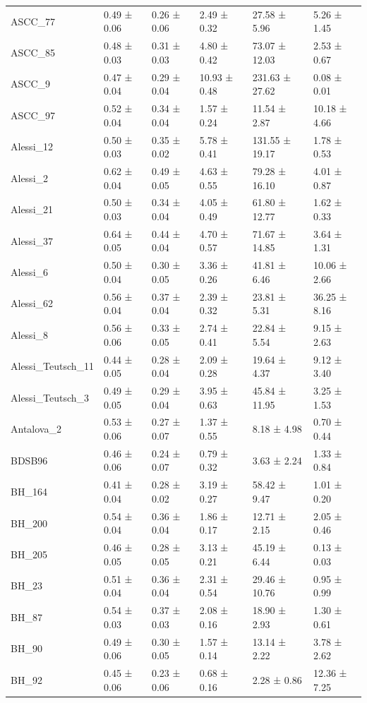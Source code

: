\begin{tabular}{llllll}
ASCC_77 & 0.49 ± 0.06 & 0.26 ± 0.06 & 2.49 ± 0.32 & 27.58 ± 5.96 & 5.26 ± 1.45 \\
ASCC_85 & 0.48 ± 0.03 & 0.31 ± 0.03 & 4.80 ± 0.42 & 73.07 ± 12.03 & 2.53 ± 0.67 \\
ASCC_9 & 0.47 ± 0.04 & 0.29 ± 0.04 & 10.93 ± 0.48 & 231.63 ± 27.62 & 0.08 ± 0.01 \\
ASCC_97 & 0.52 ± 0.04 & 0.34 ± 0.04 & 1.57 ± 0.24 & 11.54 ± 2.87 & 10.18 ± 4.66 \\
Alessi_12 & 0.50 ± 0.03 & 0.35 ± 0.02 & 5.78 ± 0.41 & 131.55 ± 19.17 & 1.78 ± 0.53 \\
Alessi_2 & 0.62 ± 0.04 & 0.49 ± 0.05 & 4.63 ± 0.55 & 79.28 ± 16.10 & 4.01 ± 0.87 \\
Alessi_21 & 0.50 ± 0.03 & 0.34 ± 0.04 & 4.05 ± 0.49 & 61.80 ± 12.77 & 1.62 ± 0.33 \\
Alessi_37 & 0.64 ± 0.05 & 0.44 ± 0.04 & 4.70 ± 0.57 & 71.67 ± 14.85 & 3.64 ± 1.31 \\
Alessi_6 & 0.50 ± 0.04 & 0.30 ± 0.05 & 3.36 ± 0.26 & 41.81 ± 6.46 & 10.06 ± 2.66 \\
Alessi_62 & 0.56 ± 0.04 & 0.37 ± 0.04 & 2.39 ± 0.32 & 23.81 ± 5.31 & 36.25 ± 8.16 \\
Alessi_8 & 0.56 ± 0.06 & 0.33 ± 0.05 & 2.74 ± 0.41 & 22.84 ± 5.54 & 9.15 ± 2.63 \\
Alessi_Teutsch_11 & 0.44 ± 0.05 & 0.28 ± 0.04 & 2.09 ± 0.28 & 19.64 ± 4.37 & 9.12 ± 3.40 \\
Alessi_Teutsch_3 & 0.49 ± 0.05 & 0.29 ± 0.04 & 3.95 ± 0.63 & 45.84 ± 11.95 & 3.25 ± 1.53 \\
Antalova_2 & 0.53 ± 0.06 & 0.27 ± 0.07 & 1.37 ± 0.55 & 8.18 ± 4.98 & 0.70 ± 0.44 \\
BDSB96 & 0.46 ± 0.06 & 0.24 ± 0.07 & 0.79 ± 0.32 & 3.63 ± 2.24 & 1.33 ± 0.84 \\
BH_164 & 0.41 ± 0.04 & 0.28 ± 0.02 & 3.19 ± 0.27 & 58.42 ± 9.47 & 1.01 ± 0.20 \\
BH_200 & 0.54 ± 0.04 & 0.36 ± 0.04 & 1.86 ± 0.17 & 12.71 ± 2.15 & 2.05 ± 0.46 \\
BH_205 & 0.46 ± 0.05 & 0.28 ± 0.05 & 3.13 ± 0.21 & 45.19 ± 6.44 & 0.13 ± 0.03 \\
BH_23 & 0.51 ± 0.04 & 0.36 ± 0.04 & 2.31 ± 0.54 & 29.46 ± 10.76 & 0.95 ± 0.99 \\
BH_87 & 0.54 ± 0.03 & 0.37 ± 0.03 & 2.08 ± 0.16 & 18.90 ± 2.93 & 1.30 ± 0.61 \\
BH_90 & 0.49 ± 0.06 & 0.30 ± 0.05 & 1.57 ± 0.14 & 13.14 ± 2.22 & 3.78 ± 2.62 \\
BH_92 & 0.45 ± 0.06 & 0.23 ± 0.06 & 0.68 ± 0.16 & 2.28 ± 0.86 & 12.36 ± 7.25 \\

\end{tabular}
